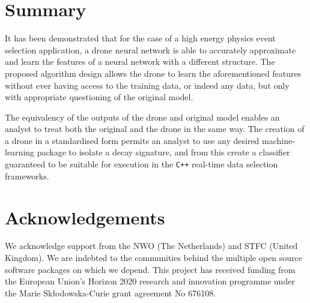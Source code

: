 \documentclass[final,5p,times,twocolumn]{elsarticle}
\begin{document}
\section{Summary}
\label{sec:summary}

It has been demonstrated that for the case of a high energy physics
event selection application, a drone neural network is able to accurately
approximate and learn the features of a neural network with a different
structure. The proposed algorithm design allows the drone to learn the
aforementioned features without ever having access to the training data,
or indeed any data, but only with appropriate questioning of the original model.

The equivalency of the outputs of the drone and original model enables an
analyst to treat both the original and the drone in the same way. The creation
of a drone in a standardised form permits an analyst to use any desired machine-learning
package to isolate a decay signature, and from this create a classifier
guaranteed to be suitable for execution in the {\tt C++} real-time data selection frameworks.


\section*{Acknowledgements}

\noindent
We acknowledge support from
the NWO (The Netherlands) and STFC (United Kingdom).
We are indebted to the communities behind the multiple open
source software packages on which we depend.
This project has received funding from the European Union’s Horizon
2020 research and innovation programme under the Marie Skłodowska-Curie
grant agreement No 676108.
\end{document}
